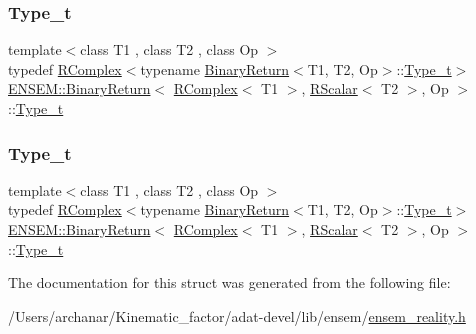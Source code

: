 \subsubsection{\texorpdfstring{Type\_t}{Type\_t}\hspace{0.1cm}{\footnotesize\ttfamily [2/3]}}
{\footnotesize\ttfamily template$<$class T1 , class T2 , class Op $>$ \\
typedef \mbox{\hyperlink{classENSEM_1_1RComplex}{R\+Complex}}$<$typename \mbox{\hyperlink{structENSEM_1_1BinaryReturn}{Binary\+Return}}$<$T1, T2, Op$>$\+::\mbox{\hyperlink{structENSEM_1_1BinaryReturn_3_01RComplex_3_01T1_01_4_00_01RScalar_3_01T2_01_4_00_01Op_01_4_a6791a00faf5cae0c8af51e11a7193897}{Type\+\_\+t}}$>$ \mbox{\hyperlink{structENSEM_1_1BinaryReturn}{E\+N\+S\+E\+M\+::\+Binary\+Return}}$<$ \mbox{\hyperlink{classENSEM_1_1RComplex}{R\+Complex}}$<$ T1 $>$, \mbox{\hyperlink{classENSEM_1_1RScalar}{R\+Scalar}}$<$ T2 $>$, Op $>$\+::\mbox{\hyperlink{structENSEM_1_1BinaryReturn_3_01RComplex_3_01T1_01_4_00_01RScalar_3_01T2_01_4_00_01Op_01_4_a6791a00faf5cae0c8af51e11a7193897}{Type\+\_\+t}}}

\mbox{\label{structENSEM_1_1BinaryReturn_3_01RComplex_3_01T1_01_4_00_01RScalar_3_01T2_01_4_00_01Op_01_4_a6791a00faf5cae0c8af51e11a7193897}} 
\subsubsection{\texorpdfstring{Type\_t}{Type\_t}\hspace{0.1cm}{\footnotesize\ttfamily [3/3]}}
{\footnotesize\ttfamily template$<$class T1 , class T2 , class Op $>$ \\
typedef \mbox{\hyperlink{classENSEM_1_1RComplex}{R\+Complex}}$<$typename \mbox{\hyperlink{structENSEM_1_1BinaryReturn}{Binary\+Return}}$<$T1, T2, Op$>$\+::\mbox{\hyperlink{structENSEM_1_1BinaryReturn_3_01RComplex_3_01T1_01_4_00_01RScalar_3_01T2_01_4_00_01Op_01_4_a6791a00faf5cae0c8af51e11a7193897}{Type\+\_\+t}}$>$ \mbox{\hyperlink{structENSEM_1_1BinaryReturn}{E\+N\+S\+E\+M\+::\+Binary\+Return}}$<$ \mbox{\hyperlink{classENSEM_1_1RComplex}{R\+Complex}}$<$ T1 $>$, \mbox{\hyperlink{classENSEM_1_1RScalar}{R\+Scalar}}$<$ T2 $>$, Op $>$\+::\mbox{\hyperlink{structENSEM_1_1BinaryReturn_3_01RComplex_3_01T1_01_4_00_01RScalar_3_01T2_01_4_00_01Op_01_4_a6791a00faf5cae0c8af51e11a7193897}{Type\+\_\+t}}}



The documentation for this struct was generated from the following file\+:\begin{DoxyCompactItemize}
\item 
/\+Users/archanar/\+Kinematic\+\_\+factor/adat-\/devel/lib/ensem/\mbox{\hyperlink{adat-devel_2lib_2ensem_2ensem__reality_8h}{ensem\+\_\+reality.\+h}}\end{DoxyCompactItemize}
